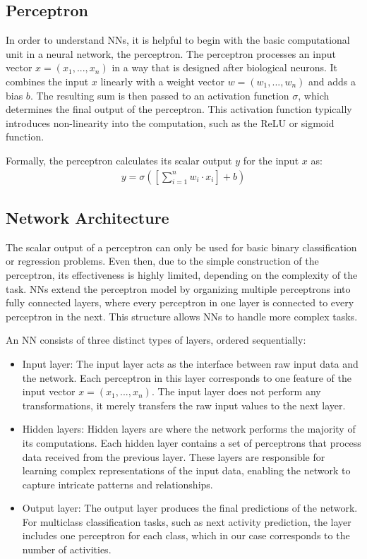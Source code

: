 \subsection{Perceptron}
\label{sec:perceptron}
In order to understand NNs,
it is helpful to begin with the basic computational unit in a neural network,
the perceptron.
The perceptron processes an input vector $x = (x_1, ..., x_n)$
in a way that is designed after biological neurons.
It combines the input $x$ linearly with a weight vector $w = (w_1, ..., w_n)$
and adds a bias $b$.
The resulting sum is then passed to an activation function $\sigma$,
which determines the final output of the perceptron.
This activation function typically introduces non-linearity into the computation,
such as the ReLU or sigmoid function. \cite{perceptron}

Formally, the perceptron calculates its scalar output $y$ for the input $x$ as:
\begin{align}
  \label{math:perceptron}
	y = \sigma\left(\left[\sum_{i = 1}^n w_i \cdot x_i \right] + b\right)
\end{align}


\subsection{Network Architecture}
The scalar output of a perceptron can only be used for basic binary classification or regression problems.
Even then, due to the simple construction of the perceptron,
its effectiveness is highly limited, depending on the complexity of the task. \cite{perceptron_limited}
NNs extend the perceptron model by organizing multiple perceptrons into fully connected layers,
where every perceptron in one layer is connected to every perceptron in the next.
This structure allows NNs to handle more complex tasks.

An NN consists of three distinct types of layers, ordered sequentially:
\begin{itemize}
\item Input layer:
The input layer acts as the interface between raw input data and the network.
Each perceptron in this layer corresponds to one feature of the input vector $x = (x_1, ..., x_n)$.
The input layer does not perform any transformations, it merely transfers the raw input values to the next layer.
\item Hidden layers:
Hidden layers are where the network performs the majority of its computations.
Each hidden layer contains a set of perceptrons that process data received from the previous layer.
These layers are responsible for learning complex representations of the input data,
enabling the network to capture intricate patterns and relationships.
\item Output layer:
The output layer produces the final predictions of the network.
For multiclass classification tasks, such as next activity prediction,
the layer includes one perceptron for each class,
which in our case corresponds to the number of activities.
\end{itemize}

